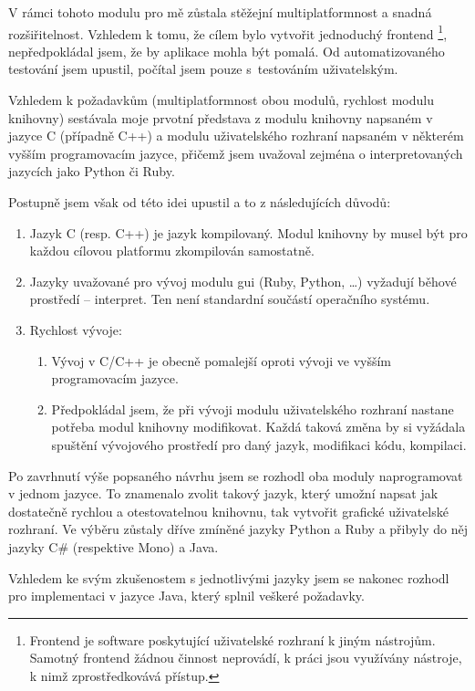 \documentclass[dp.tex]{subfiles}
\begin{document}
V rámci tohoto modulu pro mě zůstala stěžejní multiplatformnost a snadná rozšiřitelnost. Vzhledem k tomu, že cílem bylo vytvořit jednoduchý frontend \footnote{Frontend je software poskytující uživatelské rozhraní k jiným nástrojům. Samotný frontend žádnou činnost neprovádí, k práci jsou využívány nástroje, k nimž zprostředkovává přístup.}, nepředpokládal jsem, že by aplikace mohla být pomalá. Od automatizovaného testování jsem upustil, počítal jsem pouze s~testováním uživatelským.

Vzhledem k požadavkům (multiplatformnost obou modulů, rychlost modulu knihovny) sestávala moje prvotní představa z modulu knihovny napsaném v jazyce C (případně C++) a modulu uživatelského rozhraní napsaném v některém vyšším programovacím jazyce, přičemž jsem uvažoval zejména o interpretovaných jazycích jako Python či Ruby. 

Postupně jsem však od této idei upustil a to z následujících důvodů:
\begin{enumerate}
\item Jazyk C (resp. C++) je jazyk kompilovaný. Modul knihovny by musel být pro každou cílovou platformu zkompilován samostatně.
\item Jazyky uvažované pro vývoj modulu \acrshort{gui} (Ruby, Python, \ldots) vyžadují běhové prostředí -- interpret. Ten není standardní součástí operačního systému.
\item Rychlost vývoje:
	\begin{enumerate}
	\item Vývoj v C/C++ je obecně pomalejší oproti vývoji ve vyšším programovacím jazyce. 
	\item Předpokládal jsem, že při vývoji modulu uživatelského rozhraní nastane potřeba modul knihovny modifikovat. Každá taková změna by si vyžádala spuštění vývojového prostředí pro daný jazyk, modifikaci kódu, kompilaci.
	\end{enumerate}
\end{enumerate}

Po zavrhnutí výše popsaného návrhu jsem se rozhodl oba moduly naprogramovat v jednom jazyce. To znamenalo zvolit takový jazyk, který umožní napsat jak dostatečně rychlou a otestovatelnou knihovnu, tak vytvořit grafické uživatelské rozhraní. Ve výběru zůstaly dříve zmíněné jazyky Python a Ruby a přibyly do něj jazyky C\# (respektive Mono) a Java.

Vzhledem ke svým zkušenostem s jednotlivými jazyky jsem se nakonec rozhodl pro implementaci v jazyce Java, který splnil veškeré požadavky. 
\end{document}
